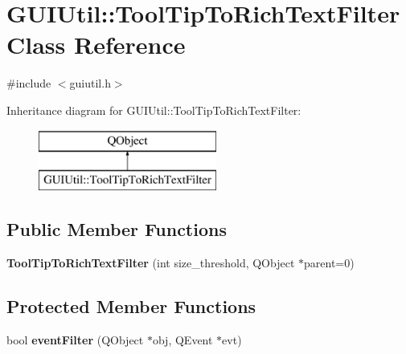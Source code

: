 \hypertarget{class_g_u_i_util_1_1_tool_tip_to_rich_text_filter}{}\section{G\+U\+I\+Util\+:\+:Tool\+Tip\+To\+Rich\+Text\+Filter Class Reference}
\label{class_g_u_i_util_1_1_tool_tip_to_rich_text_filter}


{\ttfamily \#include $<$guiutil.\+h$>$}

Inheritance diagram for G\+U\+I\+Util\+:\+:Tool\+Tip\+To\+Rich\+Text\+Filter\+:\begin{figure}[H]
\begin{center}
\leavevmode
\includegraphics[height=2.000000cm]{class_g_u_i_util_1_1_tool_tip_to_rich_text_filter}
\end{center}
\end{figure}
\subsection*{Public Member Functions}
\begin{DoxyCompactItemize}
\item 
\mbox{\label{class_g_u_i_util_1_1_tool_tip_to_rich_text_filter_abdb48682c8ec34a8f774813cd9449f0d}} 
{\bfseries Tool\+Tip\+To\+Rich\+Text\+Filter} (int size\+\_\+threshold, Q\+Object $\ast$parent=0)
\end{DoxyCompactItemize}
\subsection*{Protected Member Functions}
\begin{DoxyCompactItemize}
\item 
\mbox{\label{class_g_u_i_util_1_1_tool_tip_to_rich_text_filter_a5f4450d8b203f009a8bdc67d6d3f388c}} 
bool {\bfseries event\+Filter} (Q\+Object $\ast$obj, Q\+Event $\ast$evt)
\end{DoxyCompactItemize}


